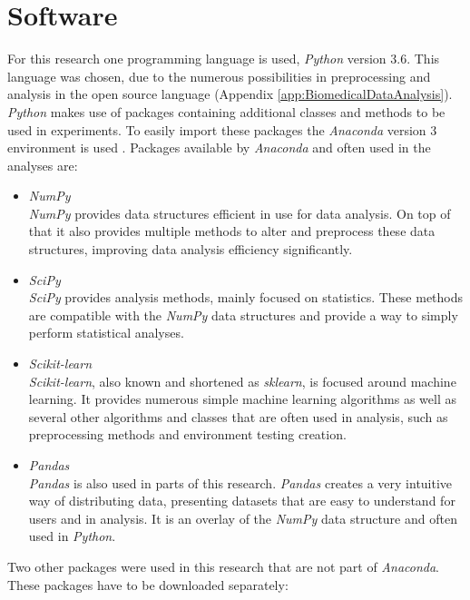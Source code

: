 \documentclass[10pt,a4paper]{report}
\begin{document}
	
	\section{Software}
	\label{PLsec:Software}
	
	For this research one programming language is used, \textit{Python} version 3.6. This language was chosen, due to the numerous possibilities in preprocessing and analysis in the open source language \cite{mckinney2010data} (Appendix \ref{app:BiomedicalDataAnalysis}). \textit{Python} makes use of packages containing additional classes and methods to be used in experiments. To easily import these packages the \textit{Anaconda} version 3 environment is used \cite{yan2018hands}. Packages available by \textit{Anaconda} and often used in the analyses are:
	
	\begin{itemize}
		\item \textit{NumPy} \cite{walt2011NumPy} \\
		\textit{NumPy} provides data structures efficient in use for data analysis. On top of that it also provides multiple methods to alter and preprocess these data structures, improving data analysis efficiency significantly.
		\item \textit{SciPy} \cite{jones2014SciPy} \\
		\textit{SciPy} provides analysis methods, mainly focused on statistics. These methods are compatible with the \textit{NumPy} data structures and provide a way to simply perform statistical analyses.
		\item \textit{Scikit-learn} \cite{pedregosa2011scikit} \\
		\textit{Scikit-learn}, also known and shortened as \textit{sklearn}, is focused around machine learning. It provides numerous simple machine learning algorithms as well as several other algorithms and classes that are often used in analysis, such as preprocessing methods and environment testing creation.
		\item \textit{Pandas} \cite{mckinney2012Python} \\
		\textit{Pandas} is also used in parts of this research. \textit{Pandas} creates a very intuitive way of distributing data, presenting datasets that are easy to understand for users and in analysis. It is an overlay of the \textit{NumPy} data structure and often used in \textit{Python}.
	\end{itemize}
	
	Two other packages were used in this research that are not part of \textit{Anaconda}. These packages have to be downloaded separately:
	
\end{document}
